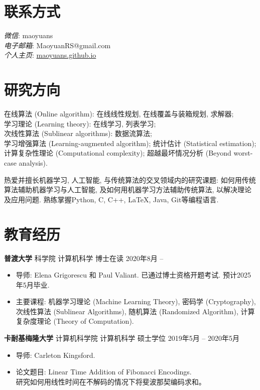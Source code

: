 \documentclass[margin, 10pt]{res-short} %
\begin{document}
\begin{resume}

\section{联系方式}
\emph{微信}: maoyuans\\
\emph{电子邮箱}: MaoyuanRS@gmail.com\\
\emph{个人主页}: \href{https://maoyuans.github.io}{maoyuans.github.io}

 
\section{研究方向}  

在线算法 (Online algorithm): 在线线性规划, 在线覆盖与装箱规划, 求解器; \\
学习理论 (Learning theory): 在线学习, 列表学习;\\
次线性算法 (Sublinear algorithms): 数据流算法;\\
学习增强算法 (Learning-augmented algorithm); 统计估计 (Statistical estimation); 计算复杂性理论 (Computational complexity); 超越最坏情况分析 (Beyond worst-case analysis).

热爱并擅长机器学习, 人工智能, 与传统算法的交叉领域内的研究课题: 如何用传统算法辅助机器学习与人工智能, 及如何用机器学习方法辅助传统算法, 以解决理论及应用问题. 熟练掌握Python, C, C++, LaTeX, Java, Git等编程语言. 

\section{教育经历}

{\bf 普渡大学}\; 科学院\; 计算机科学\; 博士在读 \hfill 2020年8月 -- \hphantom{202008000}
\begin{itemize}
\item 导师: Elena Grigorescu 和 Paul Valiant. 已通过博士资格开题考试. 预计2025年5月毕业.
\item 主要课程: 机器学习理论 (Machine Learning Theory), 密码学 (Cryptography), 次线性算法 (Sublinear Algorithms), 随机算法 (Randomized Algorithm), 计算复杂度理论 (Theory of Computation).
\end{itemize} 

{\bf 卡耐基梅隆大学}\; 计算机科学院\; 计算机科学\; 硕士学位 \hfill 2019年5月 -- 2020年5月
\begin{itemize}
\item 导师: Carleton Kingsford. \hspace{-2em}
\item 论文题目: Linear Time Addition of Fibonacci Encodings.\\
研究如何用线性时间在不解码的情况下将斐波那契编码求和。
\end{itemize} 


\end{resume}
\end{document}
